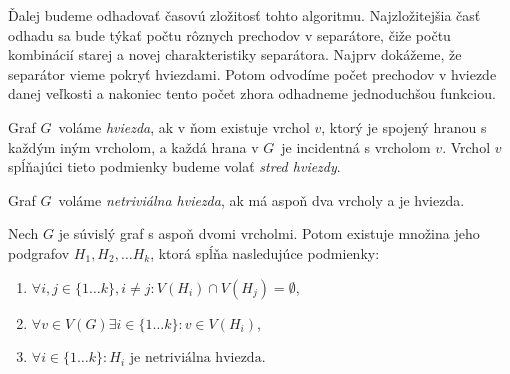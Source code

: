 Ďalej budeme odhadovať časovú zložitosť tohto algoritmu. Najzložitejšia časť odhadu sa bude týkať
počtu rôznych prechodov v separátore, čiže počtu kombinácií starej a novej charakteristiky separátora.
Najprv dokážeme, že separátor vieme pokryť hviezdami. Potom odvodíme počet prechodov v hviezde
danej veľkosti a nakoniec tento počet zhora odhadneme jednoduchšou funkciou.

\begin{defn}
    Graf $G$ voláme \emph{hviezda}, ak v ňom existuje vrchol $v$, ktorý je spojený hranou s každým iným
    vrcholom, a každá hrana v $G$ je incidentná s vrcholom $v$. Vrchol $v$ spĺňajúci tieto podmienky
    budeme volať \emph{stred hviezdy}.

    Graf $G$ voláme \emph{netriviálna hviezda}, ak má aspoň dva vrcholy a je hviezda.
\end{defn}

\begin{lema}
    Nech $G$ je súvislý graf s aspoň dvomi vrcholmi. Potom existuje množina jeho podgrafov
    $H_1, H_2, \ldots H_k$, ktorá spĺňa nasledujúce podmienky:
    \begin{enumerate}
        \item $\forall i, j \in \{1 \ldots k\}, i \neq j: V(H_i) \cap V(H_j) = \emptyset$,
        \item $\forall v \in V(G) \exists i \in \{1 \ldots k\}: v \in V(H_i)$,
        \item $\forall i \in \{1 \ldots k\}: H_i \textrm{ je netriviálna hviezda}$.
    \end{enumerate}
\end{lema}

